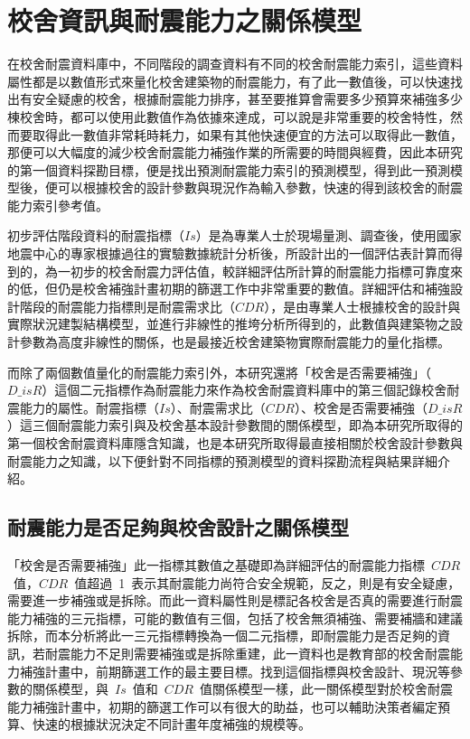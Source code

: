 \renewcommand\thetable{\arabic{chapter}-\arabic{table}}
\chapter{校舍資訊與耐震能力之關係模型}
\label{cha:ability} 

在校舍耐震資料庫中，不同階段的調查資料有不同的校舍耐震能力索引，這些資料屬性都是以數值形式來量化校舍建築物的耐震能力，有了此一數值後，可以快速找出有安全疑慮的校舍，根據耐震能力排序，甚至要推算會需要多少預算來補強多少棟校舍時，都可以使用此數值作為依據來達成，可以說是非常重要的校舍特性，然而要取得此一數值非常耗時耗力，如果有其他快速便宜的方法可以取得此一數值，那便可以大幅度的減少校舍耐震能力補強作業的所需要的時間與經費，因此本研究的第一個資料探勘目標，便是找出預測耐震能力索引的預測模型，得到此一預測模型後，便可以根據校舍的設計參數與現況作為輸入參數，快速的得到該校舍的耐震能力索引參考值。

初步評估階段資料的耐震指標（$Is$）是為專業人士於現場量測、調查後，使用國家地震中心的專家根據過往的實驗數據統計分析後，所設計出的一個評估表計算而得到的，為一初步的校舍耐震力評估值，較詳細評估所計算的耐震能力指標可靠度來的低，但仍是校舍補強計畫初期的篩選工作中非常重要的數值。詳細評估和補強設計階段的耐震能力指標則是耐震需求比（$CDR$），是由專業人士根據校舍的設計與實際狀況建製結構模型，並進行非線性的推垮分析所得到的，此數值與建築物之設計參數為高度非線性的關係，也是最接近校舍建築物實際耐震能力的量化指標。

而除了兩個數值量化的耐震能力索引外，本研究還將「校舍是否需要補強」（$D\_isR$）這個二元指標作為耐震能力來作為校舍耐震資料庫中的第三個記錄校舍耐震能力的屬性。耐震指標（$Is$）、耐震需求比（$CDR$）、校舍是否需要補強（$D\_isR$）這三個耐震能力索引與及校舍基本設計參數間的關係模型，即為本研究所取得的第一個校舍耐震資料庫隱含知識，也是本研究所取得最直接相關於校舍設計參數與耐震能力之知識，以下便針對不同指標的預測模型的資料探勘流程與結果詳細介紹。


\section{耐震能力是否足夠與校舍設計之關係模型}

「校舍是否需要補強」此一指標其數值之基礎即為詳細評估的耐震能力指標~$CDR$~值，$CDR$~值超過~1~表示其耐震能力尚符合安全規範，反之，則是有安全疑慮，需要進一步補強或是拆除。而此一資料屬性則是標記各校舍是否真的需要進行耐震能力補強的三元指標，可能的數值有三個，包括了校舍無須補強、需要補牆和建議拆除，而本分析將此一三元指標轉換為一個二元指標，即耐震能力是否足夠的資訊，若耐震能力不足則需要補強或是拆除重建，此一資料也是教育部的校舍耐震能力補強計畫中，前期篩選工作的最主要目標。找到這個指標與校舍設計、現況等參數的關係模型，與~$Is$~值和~$CDR$~值關係模型一樣，此一關係模型對於校舍耐震能力補強計畫中，初期的篩選工作可以有很大的助益，也可以輔助決策者編定預算、快速的根據狀況決定不同計畫年度補強的規模等。

